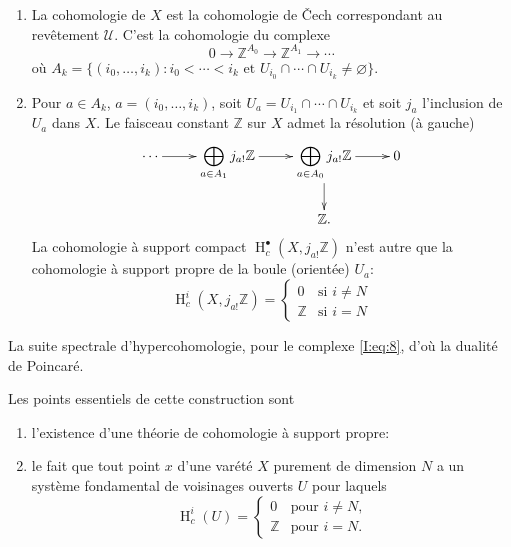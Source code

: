 \documentclass{book}
\DeclareMathOperator{\h}{H}
\newcommand{\dZ}{\mathbb{Z}}
\newcommand{\sU}{\mathscr{U}}
\begin{document}
\begin{enumerate}[\indent A]
  \item La cohomologie de $X$ est la cohomologie de \v Cech correspondant au 
    revêtement $\sU$. C'est la cohomologie du complexe 
    \begin{equation}\label{I:eq:8}
      0 \to \dZ^{A_0} \to \dZ^{A_1} \to \cdots
    \end{equation}
    où $A_k=\{(i_0,\dotsc,i_k) : i_0<\cdots<i_k\text{ et } U_{i_0}\cap \cdots \cap U_{i_k} \ne \varnothing\}$. 
    \item Pour $a\in A_k$, $a=(i_0,\dotsc,i_k)$, soit 
      $U_a=U_{i_1}\cap \cdots \cap U_{i_k}$ et soit $j_a$ l'inclusion de $U_a$ 
      dans $X$. Le faisceau constant $\dZ$ sur $X$ admet la résolution (à 
      gauche) 
      \begin{equation}\label{I:eq:9}
      \xymatrix{
        \cdots \ar[r]
          & \displaystyle\bigoplus_{a\in A_1} j_{a!}\dZ \ar[r] 
          & \displaystyle\bigoplus_{a\in A_0} j_{a!} \dZ \ar[r] \ar[d] 
          & 0 \\
        & & \dZ \text{.}
      }
      \end{equation}
      La cohomologie à support compact $\h_c^\bullet(X,j_{a!}\dZ)$ n'est autre 
      que la cohomologie à support propre de la boule (orientée) $U_a$: 
        \[
          \h_c^i(X,j_{a!}\dZ) = \begin{cases}
                                  0   & \text{si $i\ne N$} \\
                                  \dZ & \text{si $i = N$}
                                \end{cases}
        \]
\end{enumerate}

La suite spectrale d'hypercohomologie, pour le complexe \eqref{I:eq:8}, d'où 
la dualité de Poincaré. 

Les points essentiels de cette construction sont 
\begin{enumerate}[\indent a)]
  \item l'existence d'une théorie de cohomologie à support propre: 
  \item le fait que tout point $x$ d'une varété $X$ purement de dimension 
    $N$ a un système fondamental de voisinages ouverts $U$ pour laquels 
    \begin{equation}\label{I:eq:10}
      \h_c^i(U) = \begin{cases}
                    0   & \text{pour $i\ne N$,} \\
                    \dZ & \text{pour $i=N$.}
                  \end{cases}
    \end{equation}
\end{enumerate}
\end{document}
